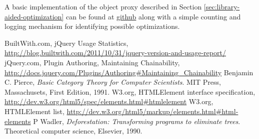 \documentclass[preprint]{sigplanconf}
\begin{document}
A basic implementation of the object proxy described in Section \ref{sec:library-aided-optimization} can be found at \href{https://github.com/johnbender/jquery-lazy-proxy/blob/79ab61e22547169d6f392512f782df2e29362ebc/lazy.js}{github} along with a simple counting and logging mechanism for identifying possible optimizations.




\begin{thebibliography}{}
\softraggedright

  BuiltWith.com,
  jQuery Usage Statistics,
  \url{http://blog.builtwith.com/2011/10/31/jquery-version-and-usage-report/}
  jQuery.com,
  Plugin Authoring,
  Maintaining Chainability,
  \url{http://docs.jquery.com/Plugins/Authoring#Maintaining_Chainability}
  Benjamin C. Pierce,
  \emph{Basic Category Theory for Computer Scientists}.
  MIT Press, Massachusets,
  First Edition,
  1991.
  W3.org,
  HTMLElement interface specification,
  \url{http://dev.w3.org/html5/spec/elements.html#htmlelement}
  W3.org,
  HTMLElement list,
  \url{http://dev.w3.org/html5/markup/elements.html#html-elements}
  P Wadler,
  \emph{Deforestation: Transforming programs to eliminate trees}.
  Theoretical computer science,
  Elsevier,
  1990.

\end{thebibliography}
\end{document}
